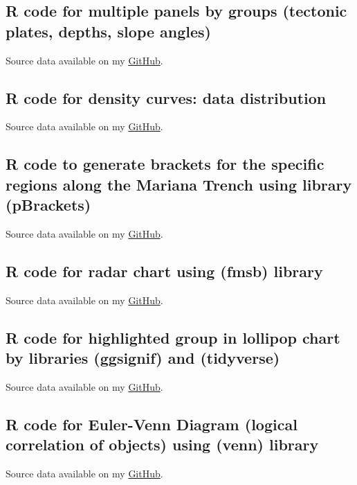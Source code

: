 \documentclass[11pt,a4paper]{report}
\begin{document}
{\begin{appendices}
\subsection{R code for multiple panels by groups (tectonic plates, depths, slope angles)}\label{R:18}
Source data available on my \href{https://github.com/paulinelemenkova/R-17-Multiple-panels-by-groups}{GitHub}.


\subsection{R code for density curves: data distribution}\label{R:19}
Source data available on my \href{https://github.com/paulinelemenkova/R-18-Density_Curves}{GitHub}.

\pagebreak

\subsection{R code to generate brackets for the specific regions along the Mariana Trench using library (pBrackets)}\label{R:20}
Source data available on my \href{https://github.com/paulinelemenkova/R-20-Scatterplot-with-overlapping-points-Brackets}{GitHub}.

\pagebreak

\subsection{R code for radar chart using (fmsb) library}\label{R:21}
Source data available on my \href{https://github.com/paulinelemenkova/R-21-Radar-Chart}{GitHub}.


\subsection{R code for highlighted group in lollipop chart by libraries (ggsignif) and (tidyverse)}\label{R:22}
Source data available on my \href{https://github.com/paulinelemenkova/22-R-Highlighted-Groups-in-Lollipop-Chart}{GitHub}.


\subsection{R code for Euler-Venn Diagram (logical correlation of objects) using (venn) library}\label{R:23}
Source data available on my \href{https://github.com/paulinelemenkova/23-R-Euler-Venn_Diagram-Rose}{GitHub}.

\pagebreak


\end{appendices}}
\end{document}
